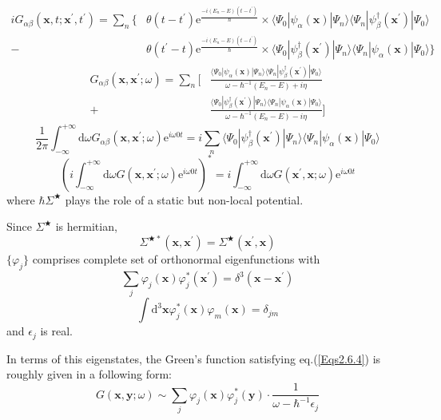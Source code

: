 \[ \begin{split} iG_{\alpha\beta}(\mathbf{x},t;\mathbf{x}^{'},t^{'}) =
 \sum_{n} \{ &\theta(t-t^{'}) \mathrm{e}^{\frac{-i(E_{n}-E)(t-t^{'})}{\hbar}} \times \langle \Psi_{0} | \psi_{\alpha}(\mathbf{x}) | \Psi_{n} \rangle \langle \Psi_{n} | \psi_{\beta}^{\dagger}(\mathbf{x}^{'}) | \Psi_{0} \rangle  \\
- \ &\theta(t^{'}-t) \mathrm{e}^{\frac{-i(E_{n}-E)(t-t^{'})}{\hbar}} \times \langle \Psi_{0} | \psi_{\beta}^{\dagger}(\mathbf{x}^{'}) | \Psi_{n} \rangle \langle \Psi_{n} | \psi_{\alpha}(\mathbf{x}) | \Psi_{0} \rangle \}
\end{split} \]
\[ \begin{split} G_{\alpha\beta}(\mathbf{x},\mathbf{x}^{'};\omega) = \sum_{n} [ 
&\frac{\langle \Psi_{0} | \psi_{\alpha}(\mathbf{x}) | \Psi_{n} \rangle \langle \Psi_{n} | \psi_{\beta}^{\dagger}(\mathbf{x}^{'}) | \Psi_{0} \rangle}{\omega-\hbar^{-1}(E_{n}-E)+i\eta} \\
+&\frac{\langle \Psi_{0} | \psi_{\beta}^{\dagger}(\mathbf{x}^{'}) | \Psi_{n} \rangle \langle \Psi_{n} | \psi_{\alpha}(\mathbf{x}) | \Psi_{0} \rangle}{\omega-\hbar^{-1}(E_{n}-E)-i\eta} ]
\end{split} \]
\[ \frac{1}{2\pi} \int_{-\infty}^{+\infty} \mathrm{d}\omega G_{\alpha\beta}(\mathbf{x},\mathbf{x}^{'};\omega)\mathrm{e}^{i\omega 0 t} = i \sum_{n} \langle \Psi_{0} | \psi_{\beta}^{\dagger}(\mathbf{x}^{'}) | \Psi_{n} \rangle \langle \Psi_{n} | \psi_{\alpha}(\mathbf{x}) | \Psi_{0} \rangle \]
\[ {\left ( i \int_{-\infty}^{+\infty} \mathrm{d} \omega G(\mathbf{x},\mathbf{x}^{'};\omega)\mathrm{e}^{i \omega 0 t} \right )}^{*} = i \int_{-\infty}^{+\infty} \mathrm{d} \omega G(\mathbf{x}^{'},\mathbf{x};\omega)\mathrm{e}^{i \omega 0 t} \]
where $\hbar\Sigma^\bigstar$ plays the role of a static but non-local potential.

Since $\Sigma^\bigstar$ is hermitian,\[\Sigma^{\bigstar*}(\mathbf{x},\mathbf{x}^{'}) = \Sigma^\bigstar(\mathbf{x}^{'},\mathbf{x}) \]
$\{\varphi_{j}\}$ comprises complete set of orthonormal eigenfunctions with
\[ \sum_{j} \varphi_{j}(\mathbf{x})\varphi_{j}^{*}(\mathbf{x}^{'}) = \delta^{3}(\mathbf{x}-\mathbf{x}^{'}) \]
\[ \int \mathrm{d}^3 \mathbf{x} \varphi_j^*(\mathbf{x})\varphi_m(\mathbf{x}) = \delta_{jm} \]
and $\epsilon_j$ is real.

In terms of this eigenstates, the Green's function satisfying eq.(\ref{Eqs2.6.4}) is roughly given in a following form:
\[ G(\mathbf{x},\mathbf{y};\omega) \sim \sum_j \varphi_j(\mathbf{x})\varphi_j^*(\mathbf{y}) \cdot \frac{1}{\omega-\hbar^{-1}\epsilon_j} \]


